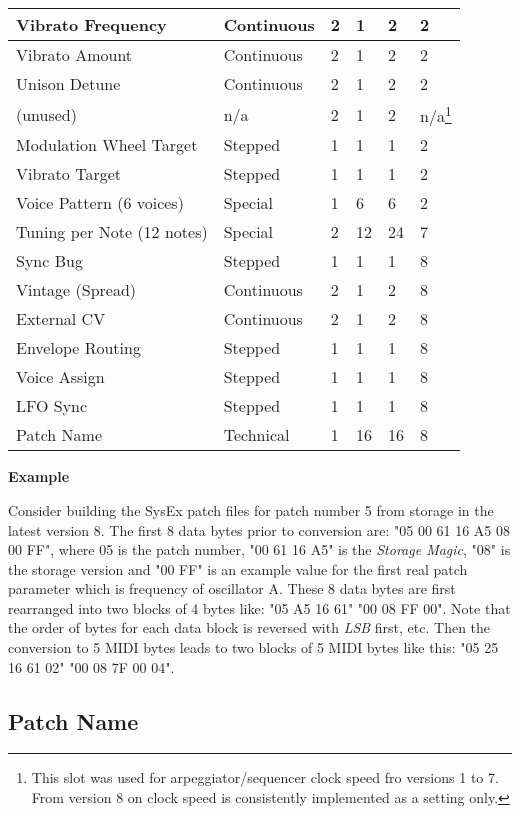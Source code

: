 \begin{longtable}[l]{|p{5cm}|p{2cm}|p{1.5cm}|p{1.5cm}|p{2cm}|p{2.5cm}|}
Vibrato Frequency & Continuous & 2 & 1 & 2 & 2 \\ \hline
Vibrato Amount & Continuous & 2 & 1 & 2 & 2 \\ \hline
Unison Detune & Continuous & 2 & 1 & 2 & 2 \\ \hline
(unused) & n/a & 2 & 1 & 2 & n/a\footnote{This slot was used for arpeggiator/sequencer clock speed fro versions 1 to 7. From version 8 on clock speed is consistently implemented as a setting only.} \\ \hline
Modulation Wheel Target & Stepped & 1 & 1 & 1 & 2 \\ \hline
Vibrato Target & Stepped & 1 & 1 & 1 & 2 \\ \hline
Voice Pattern (6 voices) & Special & 1 & 6 & 6 & 2 \\ \hline
Tuning per Note (12 notes) & Special & 2 & 12 & 24 & 7 \\ \hline
Sync Bug & Stepped & 1 & 1 & 1 & 8 \\ \hline
Vintage (Spread) & Continuous & 2 & 1 & 2 & 8 \\ \hline
External CV & Continuous & 2 & 1 & 2 & 8 \\ \hline
Envelope Routing & Stepped & 1 & 1 & 1 & 8 \\ \hline
Voice Assign & Stepped & 1 & 1 & 1 & 8 \\ \hline
LFO Sync & Stepped & 1 & 1 & 1 & 8 \\ \hline
Patch Name & Technical & 1 & 16 & 16 & 8 \\ \hline
\end{longtable}

\textbf{Example}

Consider building the SysEx patch files for patch number 5 from storage in the latest version 8. The first 8 data bytes prior to conversion are: "05 00 61 16 A5 08 00 FF", where 05 is the patch number, "00 61 16 A5" is the \textit{Storage Magic}, "08" is the storage version and "00 FF" is an example value for the first real patch parameter which is frequency of oscillator A. These 8 data bytes are first rearranged into two blocks of 4 bytes like: "05 A5 16 61" "00 08 FF 00". Note that the order of bytes for each data block is reversed with \textit{LSB} first, etc. Then the conversion to 5 MIDI bytes leads to two blocks of 5 MIDI bytes like this: "05 25 16 61 02" "00 08 7F 00 04".

\subsection{Patch Name}

